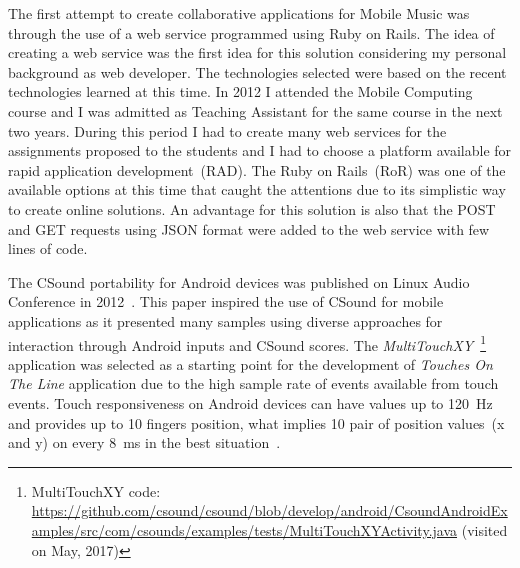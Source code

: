 The first attempt to create collaborative applications for Mobile Music was through the use of a web service programmed using Ruby on Rails.
The idea of creating a web service was the first idea for this solution considering my personal background as web developer.
The technologies selected were based on the recent technologies learned at this time. %
In 2012 I attended the Mobile Computing course and I was admitted as Teaching Assistant for the same course in the next two years.
During this period I had to create many web services for the assignments proposed to the students and I had to choose a platform available for rapid application development~(RAD).
The Ruby on Rails~(RoR) was one of the available options at this time that caught the attentions due to its simplistic way to create online solutions. %
An advantage for this solution is also that the POST and GET requests using JSON format were added to the web service with few lines of code.

The CSound portability for Android devices was published on Linux Audio Conference in 2012~\citep{Yi2012csound}.
This paper inspired the use of CSound for mobile applications as it presented many samples using diverse approaches for interaction through Android inputs and CSound scores.
The \textit{MultiTouchXY}~\footnote{MultiTouchXY code: \url{https://github.com/csound/csound/blob/develop/android/CsoundAndroidExamples/src/com/csounds/examples/tests/MultiTouchXYActivity.java} (visited on May, 2017)} application was selected as a starting point for the development of \textit{Touches On The Line} application due to the high sample rate of events available from touch events.
Touch responsiveness on Android devices can have values up to 120~Hz and provides up to 10 fingers position, what implies 10 pair of position values~(x and y) on every 8~ms in the best situation~\cite{Padre2017touchresponsiveness}.

